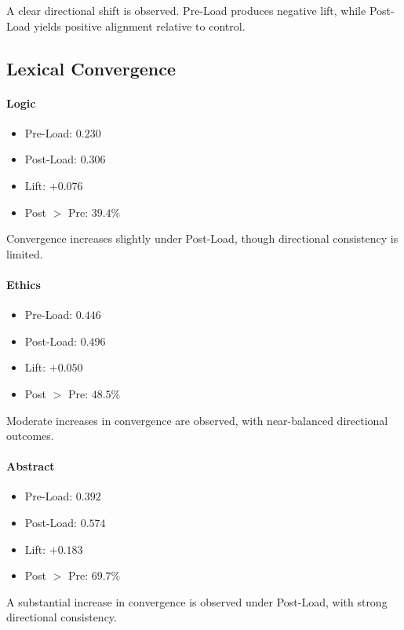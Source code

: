 \documentclass[11pt]{article}
\begin{document}
A clear directional shift is observed. Pre-Load produces negative lift, while Post-Load yields positive alignment relative to control.

\subsection{Lexical Convergence}

\paragraph{Logic}

\begin{itemize}
\item Pre-Load: $0.230$
\item Post-Load: $0.306$
\item Lift: $+0.076$
\item Post $>$ Pre: $39.4\%$
\end{itemize}

Convergence increases slightly under Post-Load, though directional consistency is limited.

\paragraph{Ethics}

\begin{itemize}
\item Pre-Load: $0.446$
\item Post-Load: $0.496$
\item Lift: $+0.050$
\item Post $>$ Pre: $48.5\%$
\end{itemize}

Moderate increases in convergence are observed, with near-balanced directional outcomes.

\paragraph{Abstract}

\begin{itemize}
\item Pre-Load: $0.392$
\item Post-Load: $0.574$
\item Lift: $+0.183$
\item Post $>$ Pre: $69.7\%$
\end{itemize}

A substantial increase in convergence is observed under Post-Load, with strong directional consistency.
\end{document}
